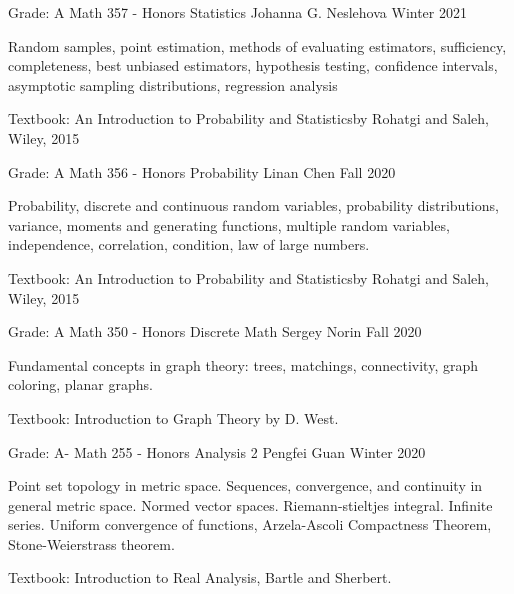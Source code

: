 \begin{cventries}


  \cventry
  {Grade: A} %
  {Math 357 - Honors Statistics} %
  {Johanna G. Neslehova} %
  {Winter 2021} %
  {
    \begin{cvitems} %
    \item {Random samples, point estimation, methods of evaluating estimators, sufficiency, completeness, best unbiased estimators, hypothesis testing, confidence intervals, asymptotic sampling distributions, regression analysis}
    \item {Textbook: An Introduction to Probability and Statisticsby Rohatgi and Saleh, Wiley, 2015}
    \end{cvitems}
  }


    \cventry
    {Grade: A} %
    {Math 356 - Honors Probability} %
    {Linan Chen} %
    {Fall 2020} %
    {
      \begin{cvitems} %
      \item {Probability, discrete and continuous random variables, probability distributions, variance, moments and generating functions, multiple random variables, independence, correlation, condition, law of large numbers.}
      \item {Textbook: An Introduction to Probability and Statisticsby Rohatgi and Saleh, Wiley, 2015}
      \end{cvitems}
    }

    \cventry
    {Grade: A} %
    {Math 350 - Honors Discrete Math} %
    {Sergey Norin} %
    {Fall 2020} %
    {
      \begin{cvitems} %
      \item {Fundamental concepts in graph theory: trees, matchings, connectivity, graph coloring, planar graphs.}
      \item {Textbook: Introduction to Graph Theory by D. West.}
      \end{cvitems}
    }


    \cventry
    {Grade: A-} %
    {Math 255 - Honors Analysis 2} %
    {Pengfei Guan} %
    {Winter 2020} %
    {
      \begin{cvitems} %
      \item {Point set topology in metric space. Sequences, convergence, and continuity in general metric space. Normed vector spaces. Riemann-stieltjes integral. Infinite series. Uniform convergence of functions, Arzela-Ascoli Compactness Theorem, Stone-Weierstrass theorem.}
      \item {Textbook: Introduction to Real Analysis, Bartle and Sherbert.}
      \end{cvitems}
    }


\end{cventries}
